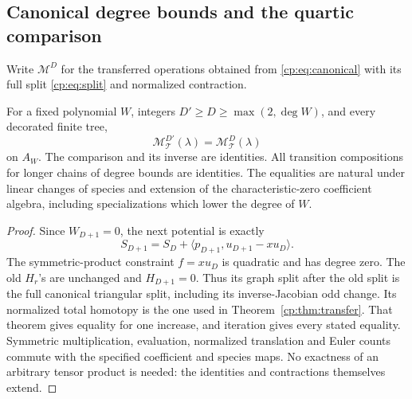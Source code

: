 \subsection{Canonical degree bounds and the quartic comparison}

Write \(\mathcal M^D\) for the transferred operations obtained
from \eqref{cp:eq:canonical} with its full split
\eqref{cp:eq:split} and normalized contraction.

\begin{corollary}
\label{cp:cor:degree}
For a fixed polynomial \(W\), integers
\(D'\geq D\geq\max(2,\deg W)\), and every decorated finite tree,
\[
 \mathcal M^{D'}_{\mathcal T}(\lambda)
                =\mathcal M^D_{\mathcal T}(\lambda)
\]
on \(A_W\).  The comparison and its inverse are identities.
All transition compositions for longer chains of degree bounds
are identities.  The equalities are natural under linear changes
of species and extension of the characteristic-zero coefficient
algebra, including specializations which lower the degree of \(W\).
\end{corollary}

\begin{proof}
Since \(W_{D+1}=0\), the next potential is exactly
\[
 S_{D+1}=S_D+
       \langle p_{D+1},u_{D+1}-xu_D\rangle.
\]
The symmetric-product constraint \(f=xu_D\) is quadratic and has
degree zero.  The old \(H_r\)'s are unchanged and \(H_{D+1}=0\).
Thus its graph split after the old split is the full canonical
triangular split, including its inverse-Jacobian odd change.
Its normalized total homotopy is the one used in
Theorem~\ref{cp:thm:transfer}.  That theorem gives equality for
one increase, and iteration gives every stated equality.
Symmetric multiplication, evaluation, normalized translation and
Euler counts commute with the specified coefficient and species
maps.  No exactness of an arbitrary tensor product is needed:
the identities and contractions themselves extend.
\end{proof}

